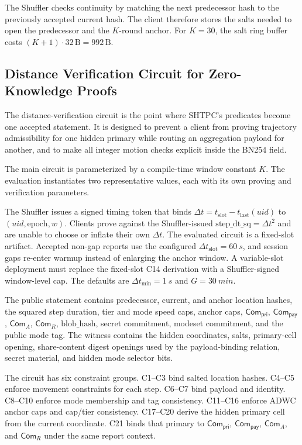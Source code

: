 \documentclass[journal]{IEEEtran}
\theoremstyle{definition}
\theoremstyle{plain}
\begin{document}
The Shuffler checks continuity by matching the next predecessor hash to the
previously accepted current hash. The client therefore stores the salts needed
to open the predecessor and the $K$-round anchor. For $K=30$, the salt ring
buffer costs $(K+1)\cdot32\,\mathrm{B}=992\,\mathrm{B}$.

\subsection{Distance Verification Circuit for Zero-Knowledge Proofs}
\label{sec:circuit}

The distance-verification circuit is the point where SHTPC's predicates become
one accepted statement. It is designed to prevent a client from proving
trajectory admissibility for one hidden primary while routing an aggregation
payload for another, and to make all integer motion checks explicit inside the
BN254 field.

The main circuit is parameterized by a compile-time window constant $K$. The
evaluation instantiates two representative values, each with its own proving
and verification parameters.

The Shuffler issues a signed timing token that binds
$\Delta t=t_{\mathrm{slot}}-t_{\mathrm{last}}(uid)$ to
$(uid,\mathrm{epoch},w)$. Clients prove against the Shuffler-issued
$\mathrm{step\_dt\_sq}=\Delta t^2$ and are unable to choose or inflate their own
$\Delta t$. The evaluated circuit is a fixed-slot artifact. Accepted non-gap
reports use the configured \(\Delta t_{\mathrm{slot}}=\SI{60}{s}\), and session
gaps re-enter warmup instead of enlarging the anchor window. A variable-slot
deployment must replace the fixed-slot C14 derivation with a Shuffler-signed
window-level cap. The defaults are $\Delta t_{\min}=\SI{1}{s}$ and
$G=\SI{30}{min}$.

The public statement contains predecessor, current, and anchor location hashes,
the squared step duration, tier and mode speed caps, anchor caps,
$\mathsf{Com}_{\mathsf{pri}}$, $\mathsf{Com}_{\mathsf{pay}}$,
$\mathsf{Com}_{A}$, $\mathsf{Com}_{R}$, $\mathrm{blob\_hash}$,
secret commitment, modeset commitment, and the public mode tag. The witness
contains the hidden coordinates, salts, primary-cell opening, share-content
digest openings used by the payload-binding relation, secret material, and
hidden mode selector bits.

The circuit has six constraint groups. C1--C3 bind salted location hashes.
C4--C5 enforce movement constraints for each step. C6--C7 bind payload and
identity. C8--C10 enforce mode membership and tag consistency. C11--C16 enforce
ADWC anchor caps and cap/tier consistency. C17--C20 derive the hidden primary
cell from the current coordinate. C21 binds that primary to
$\mathsf{Com}_{\mathsf{pri}}$, $\mathsf{Com}_{\mathsf{pay}}$,
$\mathsf{Com}_{A}$, and $\mathsf{Com}_{R}$ under the same report context.
\end{document}
